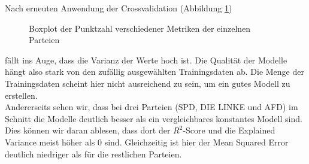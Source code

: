 \documentclass[a4paper,10pt]{scrartcl}
\begin{document}
 Nach erneuten Anwendung der Crossvalidation (Abbildung \ref{fig:scores_parties}) \begin{figure}
 	\centering
 	\caption{Boxplot der Punktzahl verschiedener Metriken der einzelnen Parteien}
 	\label{fig:scores_parties}
 	\end{figure}
 	 fällt ins Auge, dass die Varianz der Werte hoch ist. Die Qualität der Modelle hängt also stark von den zufällig ausgewählten Trainingsdaten ab. Die Menge der Trainingsdaten scheint hier nicht ausreichend zu sein, um ein gutes  Modell zu erstellen. \\
Andererseits sehen wir, dass bei drei Parteien (SPD, DIE LINKE und AFD) im Schnitt die Modelle deutlich besser als ein vergleichbares konstantes Modell sind. Dies können wir daran ablesen, dass dort der $R^2$-Score und die Explained Variance meist höher als 0 sind. Gleichzeitig ist hier der Mean Squared Error deutlich niedriger als für die restlichen Parteien. 
 
\end{document}
